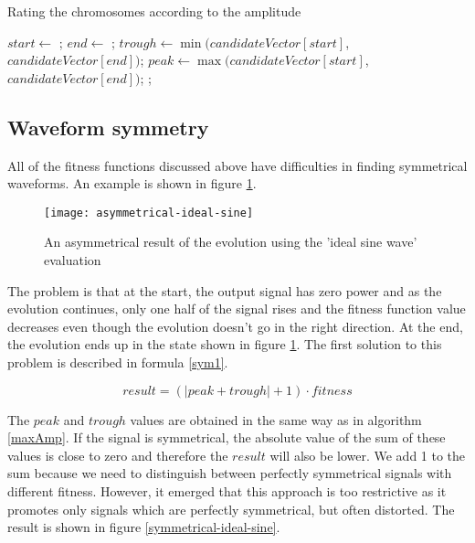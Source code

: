 \begin{algorithm}
\caption{Rating the chromosomes according to the amplitude}
\label{maxAmp}
\begin{algorithmic}[1]
        \State $start \gets$ ;
        \State $end \gets$ ;
        \State $trough \gets \min(candidateVector[start]$, $candidateVector[end])$;
        \State $peak \gets \max(candidateVector[start]$, $candidateVector[end])$;
        \State \Return {};
    \EndFunction
\end{algorithmic}
\end{algorithm}

\subsection{Waveform symmetry}
All of the fitness functions discussed above have difficulties in finding symmetrical waveforms. An example is shown in figure \ref{asymmetrical-ideal-sine}.

\begin{figure}[H]
    \centerline{\texttt{[image: asymmetrical-ideal-sine]}\label{asymmetrical-ideal-sine}}
    \caption{An asymmetrical result of the evolution using the 'ideal sine wave' evaluation}
\end{figure}

The problem is that at the start, the output signal has zero power and as the evolution continues, only one half of the signal rises and the fitness function value decreases even though the evolution doesn't go in the right direction. At the end, the evolution ends up in the state shown in figure \ref{asymmetrical-ideal-sine}. The first solution to this problem is described in formula \ref{sym1}.

\begin{equation} \label{sym1}
result = (|peak + trough| + 1) \cdot fitness
\end{equation}

The $peak$ and $trough$ values are obtained in the same way as in algorithm \ref{maxAmp}. If the signal is symmetrical, the absolute value of the sum of these values is close to zero and therefore the $result$ will also be lower. We add 1 to the sum because we need to distinguish between perfectly symmetrical signals with different fitness. However, it emerged that this approach is too restrictive as it promotes only signals which are perfectly symmetrical, but often distorted. The result is shown in figure \ref{symmetrical-ideal-sine}.

